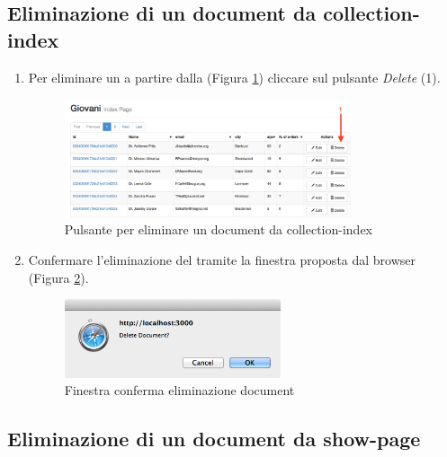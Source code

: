 	\subsection{Eliminazione di un document da collection-index} %
	\label{eliminadocumentdacollectionindex}
		\begin{enumerate}
			\item Per eliminare un  a partire dalla  (Figura \ref{fig:eliminadocumentdacollectionindex}) cliccare sul pulsante \emph{Delete} (1).

					\begin{figure}[H]
						\centering \includegraphics[width=0.8\textwidth]{img/eliminadocumentdacollectionindex.png}
					\caption{\label{fig:eliminadocumentdacollectionindex} Pulsante per eliminare un document da collection-index}
					\end{figure}

			\item \label{confermaEliminazDocument} Confermare l'eliminazione del  tramite la finestra proposta dal browser (Figura \ref{fig:confermaEliminazDocument}).
					\begin{figure}[H]
							\centering \includegraphics[width=0.6\textwidth]{img/confermaEliminazDocument.png}
					\caption{\label{fig:confermaEliminazDocument} Finestra conferma eliminazione document}
					\end{figure}

		\end{enumerate}
	
	\clearpage
	\subsection{Eliminazione di un document da show-page} %
	\label{eliminazionedocumentdashowpage}


